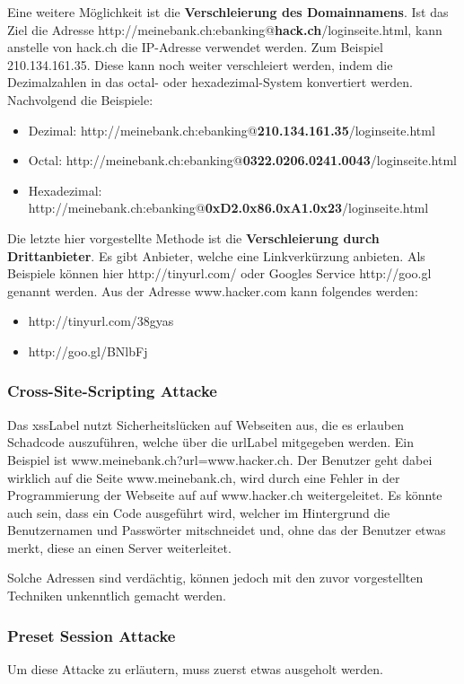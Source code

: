 Eine weitere Möglichkeit ist die \textbf{Verschleierung des Domainnamens}. Ist das Ziel die Adresse http://meinebank.ch:ebanking@\textbf{hack.ch}/loginseite.html, kann anstelle von hack.ch die IP-Adresse verwendet werden. Zum Beispiel 210.134.161.35. Diese kann noch weiter verschleiert werden, indem die Dezimalzahlen in das octal- oder hexadezimal-System konvertiert werden. Nachvolgend die Beispiele:
\begin{itemize}
\item Dezimal: http://meinebank.ch:ebanking@\textbf{210.134.161.35}/loginseite.html
\item Octal:  http://meinebank.ch:ebanking@\textbf{0322.0206.0241.0043}/loginseite.html
\item Hexadezimal:  http://meinebank.ch:ebanking@\textbf{0xD2.0x86.0xA1.0x23}/loginseite.html
\end{itemize}

Die letzte hier vorgestellte Methode ist die \textbf{Verschleierung durch Drittanbieter}. Es gibt Anbieter, welche eine Linkverkürzung anbieten. Als Beispiele können hier http://tinyurl.com/ oder Googles Service http://goo.gl genannt werden. Aus der Adresse www.hacker.com kann folgendes werden:

\begin{itemize}
\item http://tinyurl.com/38gyas
\item http://goo.gl/BNlbFj
\end{itemize}

\subsubsection{Cross-Site-Scripting Attacke}
Das \Gls{xssLabel} nutzt Sicherheitslücken auf Webseiten aus, die es erlauben Schadcode auszuführen, welche über die \Gls{urlLabel} mitgegeben werden. Ein Beispiel ist www.meinebank.ch?url=www.hacker.ch. Der Benutzer geht dabei wirklich auf die Seite www.meinebank.ch, wird durch eine Fehler in der Programmierung der Webseite auf auf www.hacker.ch weitergeleitet. Es könnte auch sein, dass ein Code ausgeführt wird, welcher im Hintergrund die Benutzernamen und Passwörter mitschneidet und, ohne das der Benutzer etwas merkt, diese an einen Server weiterleitet.

Solche Adressen sind verdächtig, können jedoch mit den zuvor vorgestellten Techniken unkenntlich gemacht werden.

\subsubsection{Preset Session Attacke}
Um diese Attacke zu erläutern, muss zuerst etwas ausgeholt werden.

